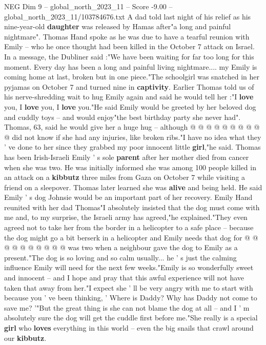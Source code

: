 \begin{textsample}{NEG Dim 9 – global\_north\_2023\_11 – Score -9.00 – global\_north\_2023\_11/103784676.txt}  \label{ex:f9_neg_066}
A dad told last night of his relief as his nine-year-old \textbf{daughter} was released by Hamas after"a long and painful nightmare".
Thomas Hand spoke as he was due to have a tearful reunion with Emily -- who he once thought had been killed in the October 7 attack on Israel.
In a message, the Dubliner said :"We have been waiting for far too long for this moment.
Every day has been a long and painful living nightmare.... my Emily is coming home at last, broken but in one piece."The schoolgirl was snatched in her pyjamas on October 7 and turned nine in \textbf{captivity}.
Earlier Thomas told us of his nerve-shredding wait to hug Emily again and said he would tell her :"I \textbf{love} you, I \textbf{love} you, I \textbf{love} you."He said Emily would be greeted by her beloved dog and cuddly toys -- and would enjoy"the best birthday party she never had".
Thomas, 63, said he would give her a huge hug -- although @ @ @ @ @ @ @ @ @ @ did not know if she had any injuries, like broken ribs."I have no idea what they ' ve done to her since they grabbed my poor innocent little \textbf{girl},"he said.
Thomas has been Irish-Israeli Emily ' s sole \textbf{parent} after her mother died from cancer when she was two.
He was initially informed she was among 100 people killed in an attack on a \textbf{kibbutz} three miles from Gaza on October 7 while visiting a friend on a sleepover.
Thomas later learned she was \textbf{alive} and being held.
He said Emily ' s dog Johnsie would be an important part of her recovery.
Emily Hand reunited with her dad Thomas"I absolutely insisted that the dog must come with me and, to my surprise, the Israeli army has agreed,"he explained."They even agreed not to take her from the border in a helicopter to a safe place -- because the dog might go a bit berserk in a helicopter and Emily needs that dog for @ @ @ @ @ @ @ @ @ @ was two when a neighbour gave the dog to Emily as a present."The dog is so loving and so calm usually... he ' s just the calming influence Emily will need for the next few weeks."Emily is so wonderfully sweet and innocent -- and I hope and pray that this awful experience will not have taken that away from her."I expect she ' ll be very angry with me to start with because you ' ve been thinking, ' Where is Daddy?
Why has Daddy not come to save me? '"But the great thing is she can not blame the dog at all -- and I ' m absolutely sure the dog will get the cuddle first before me."She really is a special \textbf{girl} who \textbf{loves} everything in this world -- even the big snails that crawl around our \textbf{kibbutz}.

\end{textsample}
